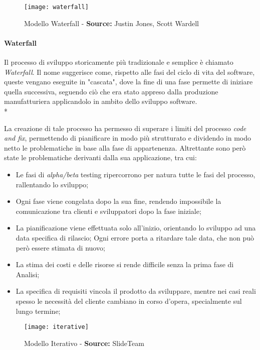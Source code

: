 \documentclass[../main.tex]{subfiles}
\begin{document}
        		\begin{figure}[h]
        			\centering
        			\texttt{[image: waterfall]}
        			\caption{Modello Waterfall - \textbf{Source:} Justin Jones, Scott Wardell}
        			\label{fig:waterfall}
        		\end{figure}
        		
        		\paragraph{Waterfall}
        		Il processo di sviluppo storicamente più tradizionale e semplice è chiamato \emph{Waterfall}\cite{waterfall}.
        		Il nome suggerisce come, rispetto alle fasi del ciclo di vita del software, queste vengano eseguite in "cascata", dove la fine di una fase permette di iniziare quella successiva, seguendo ciò che era stato appreso dalla produzione manufatturiera applicandolo in ambito dello sviluppo software.\\*
        		
        		La creazione di tale processo ha permesso di superare i limiti del processo \emph{code and fix}, permettendo di pianificare in modo più strutturato e dividendo in modo netto le problematiche in base alla fase di appartenenza.
        		Altrettante sono però state le problematiche derivanti dalla sua applicazione, tra cui:
        		\begin{itemize}
        			\item Le fasi di \emph{alpha/beta} testing ripercorrono per natura tutte le fasi del processo, rallentando lo sviluppo;
        			\item Ogni fase viene congelata dopo la sua fine, rendendo impossibile la comunicazione tra clienti e sviluppatori dopo la fase iniziale;
        			\item La pianificazione viene effettuata solo all'inizio, orientando lo sviluppo ad una data specifica di rilascio; Ogni errore porta a ritardare tale data, che non può però essere stimata di nuovo;
        			\item La stima dei costi e delle risorse si rende difficile senza la prima fase di Analisi;
        			\item La specifica di requisiti vincola il prodotto da sviluppare, mentre nei casi reali spesso le necessità del cliente cambiano in corso d'opera, specialmente sul lungo termine;
        		\end{itemize}
        
        		\begin{figure}[h]
        			\centering
        			\texttt{[image: iterative]}
        			\caption{Modello Iterativo - \textbf{Source:} SlideTeam}
        			\label{fig:iterative}
        		\end{figure}
        
\end{document}
